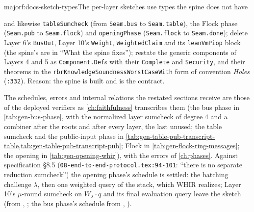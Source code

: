 \begin{finding}{major}{f:docs-sketch-types}{The per-layer sketches use types the spine does not have}
\begin{sloppypar}
and likewise \texttt{tableSumcheck} (from \texttt{Seam.\allowbreak{}bus} to \texttt{Seam.\allowbreak{}table}), the Flock phase (\texttt{Seam.\allowbreak{}pub} to \texttt{Seam.\allowbreak{}flock}) and \texttt{openingPhase} (\texttt{Seam.\allowbreak{}flock} to \texttt{Seam.\allowbreak{}done}); delete Layer 6's \texttt{BusOut}, Layer 10's \texttt{Weight}, \texttt{WeightedClaim} and its \texttt{leanVmPiop} block (the spine's are in ``What the spine fixes''); restate the generic components of Layers 4 and 5 as \texttt{Component.\allowbreak{}Def}s with their \texttt{Complete} and \texttt{Security}, and their theorems in the \texttt{rbr\allowbreak{}Knowledge\allowbreak{}Soundness\allowbreak{}Worst\allowbreak{}Case\allowbreak{}With} form of convention \emph{Holes} (\texttt{:\allowbreak{}332}). Reason: the spine is built and is the contract.
\end{sloppypar}

\begin{sloppypar}
The schedules, errors and internal relations the restated sections receive are those of the deployed verifiers as \cref{ch:faithfulness} transcribes them (the bus phase in \cref{tab:gen-bus-phase}, with the normalized layer sumcheck of degree 4 and a combiner after the roots and after every layer, the last unused; the table sumcheck and the public-input phase in \cref{tab:gen-table-pub-transcript-table,tab:gen-table-pub-transcript-pub}; Flock in \cref{tab:gen-flock-ring-messages}; the opening in \cref{tab:gen-opening-whir}), with the errors of \cref{ch:phases}. Against specification §8.5 (\texttt{08-\allowbreak{}end-\allowbreak{}to-\allowbreak{}end-\allowbreak{}protocol.\allowbreak{}tex:\allowbreak{}94-\allowbreak{}101}: ``there is no separate reduction sumcheck'') the opening phase's schedule is settled: the batching challenge $λ$, then one weighted query of the stack, which WHIR realizes; Layer 10's $μ$-round sumcheck on $W_λ · q$ and its final evaluation query leave the sketch (from , ; the bus phase's schedule from , ).
\end{sloppypar}
\end{finding}

